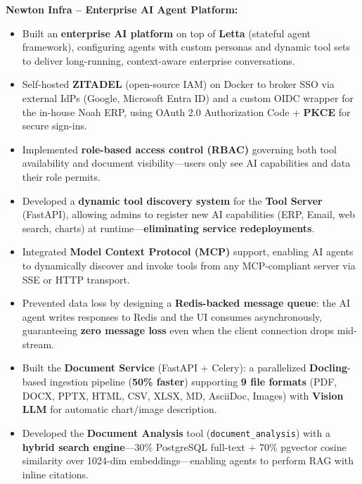 \documentclass[a4paper,10pt]{article}
\begin{document}
\vspace{0.2cm}

\textbf{Newton Infra -- Enterprise AI Agent Platform:}
\vspace{0.1cm}
\begin{itemize}[noitemsep,topsep=0pt,leftmargin=*]
    \item Built an \textbf{enterprise AI platform} on top of \textbf{Letta} (stateful agent framework), configuring agents with custom personas and dynamic tool sets to deliver long-running, context-aware enterprise conversations.
    \item Self-hosted \textbf{ZITADEL} (open-source IAM) on Docker to broker SSO via external IdPs (Google, Microsoft Entra ID) and a custom OIDC wrapper for the in-house Noah ERP, using OAuth 2.0 Authorization Code + \textbf{PKCE} for secure sign-ins.
    \item Implemented \textbf{role-based access control (RBAC)} governing both tool availability and document visibility---users only see AI capabilities and data their role permits.
    \item Developed a \textbf{dynamic tool discovery system} for the \textbf{Tool Server} (FastAPI), allowing admins to register new AI capabilities (ERP, Email, web search, charts) at runtime---\textbf{eliminating service redeployments}.
    \item Integrated \textbf{Model Context Protocol (MCP)} support, enabling AI agents to dynamically discover and invoke tools from any MCP-compliant server via SSE or HTTP transport.
    \item Prevented data loss by designing a \textbf{Redis-backed message queue}: the AI agent writes responses to Redis and the UI consumes asynchronously, guaranteeing \textbf{zero message loss} even when the client connection drops mid-stream.
    \item Built the \textbf{Document Service} (FastAPI + Celery): a parallelized \textbf{Docling}-based ingestion pipeline (\textbf{50\% faster}) supporting \textbf{9 file formats} (PDF, DOCX, PPTX, HTML, CSV, XLSX, MD, AsciiDoc, Images) with \textbf{Vision LLM} for automatic chart/image description.
    \item Developed the \textbf{Document Analysis} tool (\texttt{document\_analysis}) with a \textbf{hybrid search engine}---30\% PostgreSQL full-text + 70\% pgvector cosine similarity over 1024-dim embeddings---enabling agents to perform RAG with inline citations.

\end{itemize}
\end{document}
